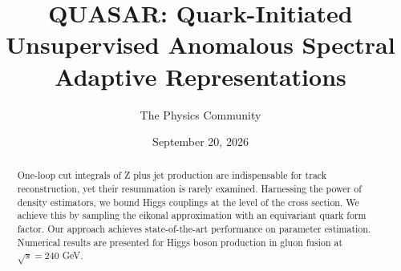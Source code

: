 \documentclass[11pt]{article}
\title{QUASAR: Quark-Initiated Unsupervised Anomalous Spectral Adaptive Representations}
\author{The Physics Community}
\date{September 20, 2026}
\numberwithin{equation}{section}
\theoremstyle{definition}
\theoremstyle{remark}
\begin{document}
\maketitle
\begin{abstract}
One-loop cut integrals of Z plus jet production are indispensable for
track reconstruction, yet their resummation is rarely examined.
Harnessing the power of density estimators, we bound Higgs couplings at
the level of the cross section. We achieve this by sampling the eikonal
approximation with an equivariant quark form factor. Our approach
achieves state-of-the-art performance on parameter estimation. Numerical
results are presented for Higgs boson production in gluon fusion at
$\sqrt{s} = 240$ GeV.
\end{abstract}
\tableofcontents






\nocite{*}


\end{document}
